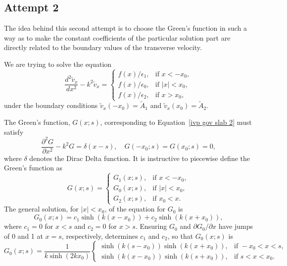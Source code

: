 \documentclass{aastex61}
\begin{document}
\subsection{Attempt 2}

The idea behind this second attempt is to choose the Green's function in such a way as to make the constant coefficients of the particular solution part are directly related to the boundary values of the transverse velocity.

We are trying to solve the equation
\begin{equation}
\frac{d^2\tilde{v}_x}{dx^2} - k^2\tilde{v}_x = 
\begin{cases}
f(x)/\epsilon_1, & \text{if  } x<-x_0,\\
f(x)/\epsilon_0, & \text{if  } |x|<x_0,\\
f(x)/\epsilon_2, & \text{if  } x>x_0,
\end{cases}
\label{ivp gov slab 2}
\end{equation}
under the boundary conditions $\tilde{v}_x(-x_0) = \tilde{A}_1$ and $\tilde{v}_x(x_0) = \tilde{A}_2$.

The Green's function, $G(x;s)$, corresponding to Equation~\eqref{ivp gov slab 2} must satisfy 
\begin{equation}
\frac{\partial^2G}{\partial x^2} - k^2 G = \delta(x-s), \quad G(-x_0;s) = G(x_0;s) = 0,
\end{equation}
where $\delta$ denotes the Dirac Delta function. It is instructive to piecewise define the Green's function as
\begin{equation}
G(x;s) = 
\begin{cases}
G_1(x;s), & \text{if } x < -x_0, \\
G_0(x;s), & \text{if } |x| < x_0, \\
G_2(x;s), & \text{if } x_0 < x.
\end{cases}
\end{equation}
The general solution, for $|x| < x_0$, of the equation for $G_0$ is
\begin{equation}
G_0(x;s) = c_1\sinh(k(x - x_0)) + c_2\sinh(k(x + x_0)),
\end{equation}
where $c_1 = 0$ for $x < s$ and $c_2 = 0$ for $x > s$. Ensuring $G_0$ and $\partial G_0 / \partial x$ have jumps of 0 and 1 at $x = s$, respectively, determines $c_1$ and $c_2$, so that $G_0(x;s)$ is
\begin{equation}
G_0(x;s) = \frac{1}{k\sinh(2k x_0)}
\begin{cases}
\sinh(k(s - x_0))\sinh(k(x + x_0)), & \text{if } -x_0<x<s, \\
\sinh(k(x - x_0))\sinh(k(s + x_0)), & \text{if } s<x<x_0.
\end{cases}
\end{equation}
\end{document}
